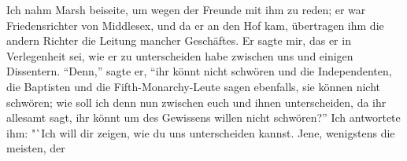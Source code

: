 Ich nahm Marsh beiseite, um wegen der Freunde mit ihm
zu reden; er war Friedensrichter von Middlesex, und da er an den
Hof kam, übertragen ihm die andern Richter die Leitung mancher
Geschäftes. Er sagte mir, das er in Verlegenheit sei, wie er zu
unterscheiden habe zwischen uns und einigen Dissentern. "`Denn,"'
sagte er, "`ihr könnt nicht schwören und die Independenten, die
Baptisten und die Fifth-Monarchy-Leute sagen ebenfalls, sie können
nicht schwören; wie soll ich denn nun zwischen euch und ihnen 
unterscheiden, da ihr allesamt sagt, ihr könnt um des Gewissens willen
nicht schwören?"' 
Ich antwortete ihm: "`Ich will dir zeigen, wie
du uns unterscheiden kannst. Jene, wenigstens die meisten, der